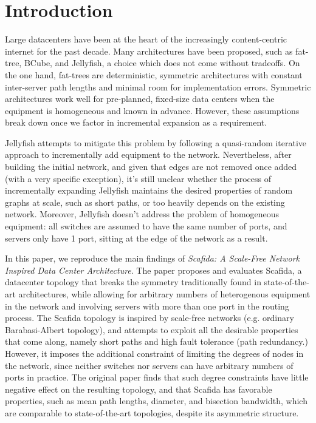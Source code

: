 \section{Introduction}

Large datacenters have been at the heart of the increasingly content-centric internet for the past decade. Many architectures have been proposed, such as fat-tree, BCube, and Jellyfish, a choice which does not come without tradeoffs. On the one hand, fat-trees are deterministic, symmetric architectures with constant inter-server path lengths and minimal room for implementation errors. Symmetric architectures work well for pre-planned, fixed-size data centers when the equipment is homogeneous and known in advance. However, these assumptions break down once we factor in incremental expansion as a requirement.

Jellyfish attempts to mitigate this problem by following a quasi-random iterative approach to incrementally add equipment to the network. Nevertheless, after building the initial network, and given that edges are not removed once added (with a very specific exception), it’s still unclear whether the process of incrementally expanding Jellyfish maintains the desired properties of random graphs at scale, such as short paths, or too heavily depends on the existing network. Moreover, Jellyfish doesn’t address the problem of homogeneous equipment: all switches are assumed to have the same number of ports, and servers only have 1 port, sitting at the edge of the network as a result.

In this paper, we reproduce the main findings of \textit{Scafida: A Scale-Free Network Inspired Data Center Architecture}. The paper proposes and evaluates Scafida, a datacenter topology that breaks the symmetry traditionally found in state-of-the-art architectures, while allowing for arbitrary numbers of heterogenous equipment in the network and involving servers with more than one port in the routing process. The Scafida topology is inspired by scale-free networks (e.g. ordinary Barabasi-Albert topology), and attempts to exploit all the desirable properties that come along, namely short paths and high fault tolerance (path redundancy.) However, it imposes the additional constraint of limiting the degrees of nodes in the network, since neither switches nor servers can have arbitrary numbers of ports in practice. The original paper finds that such degree constraints have little negative effect on the resulting topology, and that Scafida has favorable properties, such as mean path lengths, diameter, and bisection bandwidth, which are comparable to state-of-the-art topologies, despite its asymmetric structure.

